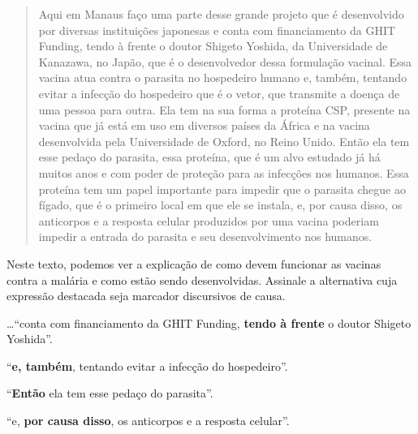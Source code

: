 \begin{quote}

Aqui em Manaus faço uma parte desse grande projeto que é desenvolvido
por diversas instituições japonesas e conta com financiamento da GHIT
Funding, tendo à frente o doutor Shigeto Yoshida, da Universidade de
Kanazawa, no Japão, que é o desenvolvedor dessa formulação vacinal.
Essa vacina atua contra o parasita no hospedeiro humano e, também,
tentando evitar a infecção do hospedeiro que é o vetor, que transmite a
doença de uma pessoa para outra. Ela tem na sua forma a proteína CSP,
presente na vacina que já está em uso em diversos países da África e na
vacina desenvolvida pela Universidade de Oxford, no Reino Unido. Então
ela tem esse pedaço do parasita, essa proteína, que é um alvo estudado
já há muitos anos e com poder de proteção para as infecções nos humanos.
Essa proteína tem um papel importante para impedir que o parasita chegue
ao fígado, que é o primeiro local em que ele se instala, e, por causa
disso, os anticorpos e a resposta celular produzidos por uma vacina
poderiam impedir a entrada do parasita e seu desenvolvimento nos
humanos.

\end{quote}


Neste texto, podemos ver a explicação de como devem funcionar as vacinas
contra a malária e como estão sendo desenvolvidas. Assinale a alternativa
cuja expressão destacada seja marcador discursivos de causa.

\begin{escolha}

    \item \ldots ``conta com financiamento da GHIT Funding, \textbf{tendo à frente} o doutor Shigeto Yoshida''.

    \item ``\textbf{e, também}, tentando evitar a infecção do hospedeiro''.

    \item ``\textbf{Então} ela tem esse pedaço do parasita''.

    \item ``e, \textbf{por causa disso}, os anticorpos e a resposta celular''.

\end{escolha}

